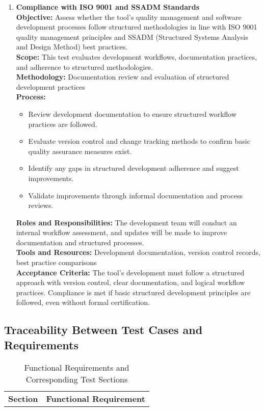 \documentclass[12pt, titlepage]{article}
\begin{document}
\begin{enumerate}[label={\bf \textcolor{Maroon}{test-SRT-\arabic*}}, wide=0pt, font=\itshape]
\begin{enumerate}[label={\bf \textcolor{Maroon}{test-CPL-\arabic*}}, wide=0pt, font=\itshape]
  \item \textbf{Compliance with ISO 9001 and SSADM Standards} \\[2mm]
    \textbf{Objective:} Assess whether the tool’s quality management and software development processes follow structured methodologies in line with ISO 9001 quality management principles and SSADM (Structured Systems Analysis and Design Method) best practices. \\[2mm]
    \textbf{Scope:} This test evaluates development workflows, documentation practices, and adherence to structured methodologies. \\[2mm]
    \textbf{Methodology:} Documentation review and evaluation of structured development practices \\[2mm]
    \textbf{Process:}
    \begin{itemize}
      \item Review development documentation to ensure structured workflow practices are followed.
      \item Evaluate version control and change tracking methods to confirm basic quality assurance measures exist.
      \item Identify any gaps in structured development adherence and suggest improvements.
      \item Validate improvements through informal documentation and process reviews.
    \end{itemize}
    \textbf{Roles and Responsibilities:} The development team will conduct an internal workflow assessment, and updates will be made to improve documentation and structured processes. \\[2mm]
    \textbf{Tools and Resources:} Development documentation, version control records, best practice comparisons \\[2mm]
    \textbf{Acceptance Criteria:} The tool's development must follow a structured approach with version control, clear documentation, and logical workflow practices. Compliance is met if basic structured development principles are followed, even without formal certification.
\end{enumerate}

\subsection{Traceability Between Test Cases and Requirements} \label{trace-sys}

\begin{table}[H]
  \centering
  \caption{Functional Requirements and Corresponding Test Sections}
  \begin{tabular}{|p{}|p{}|}
    \toprule \textbf{Section} & \textbf{Functional Requirement} \\ 
    

\end{tabular}
\end{table}
\end{enumerate}
\end{document}
